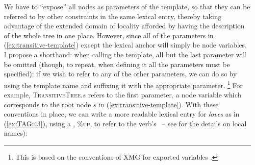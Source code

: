 \documentclass[output=paper,hidelinks]{langscibook}
\begin{document}
\ea\label{ex:transitive-template}
\z
%
\largerpage
We have to ``expose'' all nodes as parameters of the template, so that
they can be referred to by other constraints in the same lexical entry, thereby
taking advantage of the extended domain of locality afforded by having the
description of the whole tree in one place. However, since all of the parameters
in (\ref{ex:transitive-template}) except the lexical anchor will simply be node
variables, I propose a shorthand: when calling the template, all but the last
parameter will be omitted (though, to repeat, when defining it all the
parameters must be specified); if we wish to refer to any of the other
parameters, we can do so by using the template name and suffixing it with the
appropriate parameter.%
%
\footnote{This is based on the conventions of XMG for exported variables
  \citep[602--604]{crabbe:xmg}.}
%
For example, \textsc{TransitiveTree.$s$} refers to the first parameter, a node
variable which corresponds to the root node $s$ in
(\ref{ex:transitive-template}). With these conventions in place, we can write a
more readable lexical entry for \textit{loves} as in  (\ref{ex:TAG:43}), using a , \textsc{\%up}, to refer to the verb's \fstruc\ -- see
 for the details on local names):%
%
\end{document}
